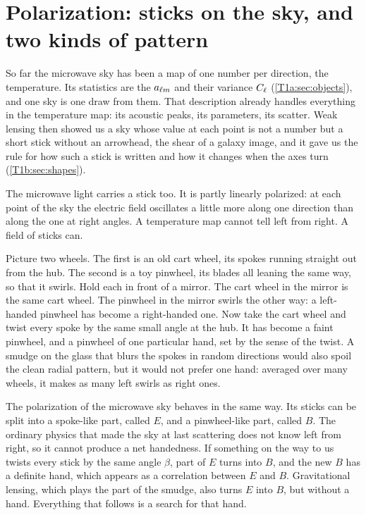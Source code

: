 \section{Polarization: sticks on the sky, and two kinds of pattern}
\label{T1c:sec:eb}

So far the microwave sky has been a map of one number per direction, the temperature. Its statistics are the $a_{\ell m}$ and their variance $C_\ell$ (\cref{T1a:sec:objects}), and one sky is one draw from them. That description already handles everything in the temperature map: its acoustic peaks, its parameters, its scatter. Weak lensing then showed us a sky whose value at each point is not a number but a short stick without an arrowhead, the shear of a galaxy image, and it gave us the rule for how such a stick is written and how it changes when the axes turn (\cref{T1b:sec:shapes}).

The microwave light carries a stick too. It is partly linearly polarized: at each point of the sky the electric field oscillates a little more along one direction than along the one at right angles. A temperature map cannot tell left from right. A field of sticks can.

Picture two wheels. The first is an old cart wheel, its spokes running straight out from the hub. The second is a toy pinwheel, its blades all leaning the same way, so that it swirls. Hold each in front of a mirror. The cart wheel in the mirror is the same cart wheel. The pinwheel in the mirror swirls the other way: a left-handed pinwheel has become a right-handed one. Now take the cart wheel and twist every spoke by the same small angle at the hub. It has become a faint pinwheel, and a pinwheel of one particular hand, set by the sense of the twist. A smudge on the glass that blurs the spokes in random directions would also spoil the clean radial pattern, but it would not prefer one hand: averaged over many wheels, it makes as many left swirls as right ones.

The polarization of the microwave sky behaves in the same way. Its sticks can be split into a spoke-like part, called $E$, and a pinwheel-like part, called $B$. The ordinary physics that made the sky at last scattering does not know left from right, so it cannot produce a net handedness. If something on the way to us twists every stick by the same angle $\beta$, part of $E$ turns into $B$, and the new $B$ has a definite hand, which appears as a correlation between $E$ and $B$. Gravitational lensing, which plays the part of the smudge, also turns $E$ into $B$, but without a hand. Everything that follows is a search for that hand.

